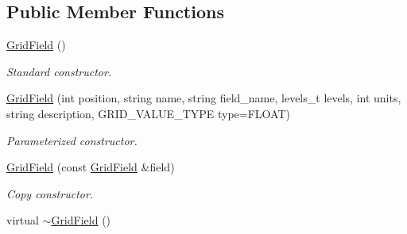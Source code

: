 \subsection*{Public Member Functions}
\begin{DoxyCompactItemize}
\item 
\hypertarget{classfwi_1_1grid_1_1GridField_acd61c3843963dfcfe28ecccd4fd99a36}{\hyperlink{classfwi_1_1grid_1_1GridField_acd61c3843963dfcfe28ecccd4fd99a36}{Grid\-Field} ()}\label{classfwi_1_1grid_1_1GridField_acd61c3843963dfcfe28ecccd4fd99a36}

\begin{DoxyCompactList}\small\item\em Standard constructor. \end{DoxyCompactList}\item 
\hyperlink{classfwi_1_1grid_1_1GridField_a26292231730e78f513be74f3ceee53ab}{Grid\-Field} (int position, string name, string field\-\_\-name, levels\-\_\-t levels, int units, string description, G\-R\-I\-D\-\_\-\-V\-A\-L\-U\-E\-\_\-\-T\-Y\-P\-E type=F\-L\-O\-A\-T)
\begin{DoxyCompactList}\small\item\em Parameterized constructor. \end{DoxyCompactList}\item 
\hypertarget{classfwi_1_1grid_1_1GridField_a11f0754b1390ed73b6a7e31ba3625f5e}{\hyperlink{classfwi_1_1grid_1_1GridField_a11f0754b1390ed73b6a7e31ba3625f5e}{Grid\-Field} (const \hyperlink{classfwi_1_1grid_1_1GridField}{Grid\-Field} \&field)}\label{classfwi_1_1grid_1_1GridField_a11f0754b1390ed73b6a7e31ba3625f5e}

\begin{DoxyCompactList}\small\item\em Copy constructor. \end{DoxyCompactList}\item 
\hypertarget{classfwi_1_1grid_1_1GridField_aba718e0212fd2d87d88d8c744ae4b6cf}{virtual \hyperlink{classfwi_1_1grid_1_1GridField_aba718e0212fd2d87d88d8c744ae4b6cf}{$\sim$\-Grid\-Field} ()}\label{classfwi_1_1grid_1_1GridField_aba718e0212fd2d87d88d8c744ae4b6cf}


\end{DoxyCompactItemize}
